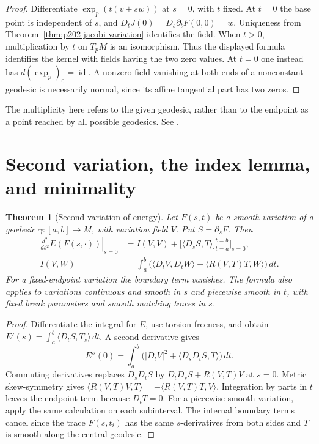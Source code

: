\documentclass[11pt,oneside,openany]{book}
\theoremstyle{plain}
\newtheorem{theorem}{Theorem}[chapter]
\theoremstyle{definition}
\theoremstyle{remark}
\begin{document}
\begin{proof}
Differentiate \(\exp_p(t(v+sw))\) at \(s=0\), with \(t\) fixed.
At \(t=0\) the base point is independent of \(s\), and
\(D_tJ(0)=D_s\partial_tF(0,0)=w\). Uniqueness from
Theorem~\ref{thm:p202-jacobi-variation} identifies the field.
When \(t>0\), multiplication by \(t\) on \(T_pM\) is an
isomorphism. Thus the displayed formula identifies the kernel
with fields having the two zero values. At \(t=0\) one instead
has \(d(\exp_p)_0=\operatorname{id}\).
A nonzero field vanishing at both ends of a nonconstant geodesic
is necessarily normal, since its affine tangential part has
two zeros.
\end{proof}

The multiplicity here refers to the given geodesic, rather than
to the endpoint as a point reached by all possible geodesics.
See \cite[Chapter 10, Proposition 10.10 and Proposition 10.20]{LeeRM}.

\section{Second variation, the index lemma, and minimality}
\label{p202:G18}

\begin{theorem}[Second variation of energy]\label{thm:p202-second-variation}
Let \(F(s,t)\) be a smooth variation of a geodesic
\(\gamma:[a,b]\to M\), with variation field \(V\).
Put \(S=\partial_sF\). Then
\[
 \begin{aligned}
 \left.\frac{d^2}{ds^2}E(F(s,\cdot))\right|_{s=0}
 &= I(V,V)+\big[\langle D_sS,T\rangle\big]_{t=a}^{t=b}\big|_{s=0},\\
 I(V,W)
 &=\int_a^b
  \big(\langle D_tV,D_tW\rangle-\langle R(V,T)T,W\rangle\big)\,dt .
 \end{aligned}
\]
For a fixed-endpoint variation the boundary term vanishes.
The formula also applies to variations continuous and smooth
in \(s\) and piecewise smooth in \(t\), with fixed break
parameters and smooth matching traces in \(s\).
\end{theorem}

\begin{proof}
Differentiate the integral for \(E\), use torsion freeness,
and obtain \(E'(s)=\int_a^b\langle D_tS,T_s\rangle\,dt\).
A second derivative gives
\[
 E''(0)=\int_a^b
       \big(|D_tV|^2+\langle D_sD_tS,T\rangle\big)\,dt.
\]
Commuting derivatives replaces \(D_sD_tS\) by
\(D_tD_sS+R(V,T)V\) at \(s=0\).
Metric skew-symmetry gives
\(\langle R(V,T)V,T\rangle=-\langle R(V,T)T,V\rangle\).
Integration by parts in \(t\) leaves the endpoint term because
\(D_tT=0\). For a piecewise smooth variation, apply the same
calculation on each subinterval. The internal boundary terms
cancel since the trace \(F(s,t_i)\) has the same \(s\)-derivatives
from both sides and \(T\) is smooth along the central geodesic.
\end{proof}
\end{document}
